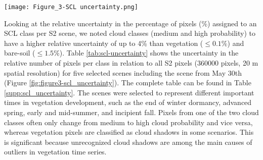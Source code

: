 \begin{figure*}
    \centering
    \texttt{[image: Figure\_3-SCL uncertainty.png]}
    \caption{RGB L1C \gls{TOA}true-color composite (A), \gls{SCL} majority vote (B) and \gls{SCL} class assignment confidence scores (C) for a S2A scene acquired on May 30th 2019. The more greenish the color in C the higher the confidence score and the lower the uncertainty. A small-scale detail plot (red rectangle in A-C) highlighting the higher uncertainties at class boundaries is depicted in D to F.}
    \label{fig:figure3-scl_uncertainty}
\end{figure*}

Looking at the relative uncertainty in the percentage of pixels (\%) assigned to an \gls{SCL} class per \gls{S2} scene, we noted cloud classes (medium and high probability) to have a higher relative uncertainty of up to 4\% than vegetation ($\le0.1\%$) and bare-soil ($\le1.5\%$). Table \ref{tab:scl-uncertainty} shows the uncertainty in the relative number of pixels per class in relation to all \gls{S2} pixels (360000 pixels, 20 m spatial resolution) for five selected scenes including the scene from May 30th (Figure \ref{fig:figure3-scl_uncertainty}). The complete table can be found in Table \ref{supp:scl_uncertainty}. The scenes were selected to represent different important times in vegetation development, such as the end of winter dormancy, advanced spring, early and mid-summer, and incipient fall. Pixels from one of the two cloud classes often only change from medium to high cloud probability and vice versa, whereas vegetation pixels are classified as cloud shadows in some scenarios. This is significant because unrecognized cloud shadows are among the main causes of outliers in vegetation time series.


